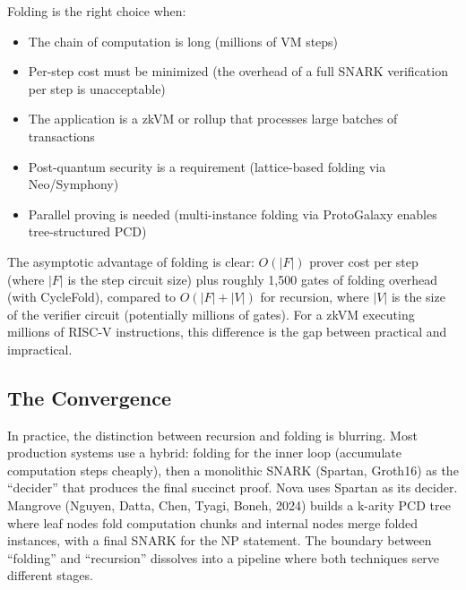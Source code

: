 \documentclass[
  11pt,
  openany]{report}
\providecommand{\tightlist}{%
  \setlength{\itemsep}{0pt}\setlength{\parskip}{0pt}}
\begin{document}
Folding is the right choice when:

\begin{itemize}
\tightlist
\item
  The chain of computation is long (millions of VM steps)
\item
  Per-step cost must be minimized (the overhead of a full SNARK verification per
  step is unacceptable)
\item
  The application is a zkVM or rollup that processes large batches of
  transactions
\item
  Post-quantum security is a requirement (lattice-based folding via
  Neo/Symphony)
\item
  Parallel proving is needed (multi-instance folding via ProtoGalaxy enables
  tree-structured PCD)
\end{itemize}

The asymptotic advantage of folding is clear: \(O(|F|)\) prover cost per step
(where \(|F|\) is the step circuit size) plus roughly 1,500 gates of folding
overhead (with CycleFold), compared to \(O(|F| + |V|)\) for recursion, where
\(|V|\) is the size of the verifier circuit (potentially millions of gates). For
a zkVM executing millions of RISC-V instructions, this difference is the gap
between practical and impractical.

\subsection{The Convergence}\label{the-convergence}

In practice, the distinction between recursion and folding is blurring. Most
production systems use a hybrid: folding for the inner loop (accumulate
computation steps cheaply), then a monolithic SNARK (Spartan, Groth16) as the
``decider'' that produces the final succinct proof. Nova uses Spartan as its
decider. Mangrove (Nguyen, Datta, Chen, Tyagi, Boneh, 2024) builds a k-arity PCD
tree where leaf nodes fold computation chunks and internal nodes merge folded
instances, with a final SNARK for the NP statement. The boundary between
``folding'' and ``recursion'' dissolves into a pipeline where both techniques
serve different stages.
\end{document}
